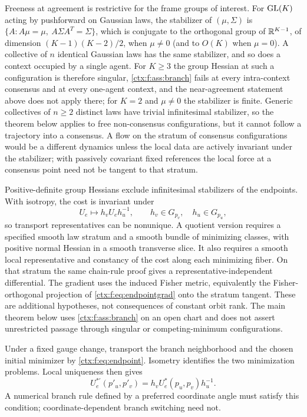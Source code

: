 Freeness at agreement is restrictive for the frame groups of interest. For $\mathrm{GL}(K)$ acting by pushforward on Gaussian laws, the stabilizer of $(\mu,\Sigma)$ is $\{A:A\mu=\mu,\ A\Sigma A^T=\Sigma\}$, which is conjugate to the orthogonal group of $\mathbb R^{K-1}$, of dimension $(K-1)(K-2)/2$, when $\mu\neq0$ (and to $O(K)$ when $\mu=0$). A collective of $n$ identical Gaussian laws has the same stabilizer, and so does a context occupied by a single agent. For $K\geq3$ the group Hessian at such a configuration is therefore singular, \cref{ctx:f:ass:branch} fails at every intra-context consensus and at every one-agent context, and the near-agreement statement above does not apply there; for $K=2$ and $\mu\neq0$ the stabilizer is finite. Generic collectives of $n\geq2$ distinct laws have trivial infinitesimal stabilizer, so the theorem below applies to free non-consensus configurations, but it cannot follow a trajectory into a consensus. A flow on the stratum of consensus configurations would be a different dynamics unless the local data are actively invariant under the stabilizer; with passively covariant fixed references the local force at a consensus point need not be tangent to that stratum.

Positive-definite group Hessians exclude infinitesimal stabilizers of the endpoints. With isotropy, the cost is invariant under
\begin{equation}
 U_e\longmapsto h_vU_eh_u^{-1},\qquad
 h_v\in G_{p_v},\quad h_u\in G_{p_u},
\end{equation}
so transport representatives can be nonunique. A quotient version requires a specified smooth law stratum and a smooth bundle of minimizing classes, with positive normal Hessian in a smooth transverse slice. It also requires a smooth local representative and constancy of the cost along each minimizing fiber. On that stratum the same chain-rule proof gives a representative-independent differential. The gradient uses the induced Fisher metric, equivalently the Fisher-orthogonal projection of \cref{ctx:f:eq:endpointgrad} onto the stratum tangent. These are additional hypotheses, not consequences of constant orbit rank. The main theorem below uses \cref{ctx:f:ass:branch} on an open chart and does not assert unrestricted passage through singular or competing-minimum configurations.

Under a fixed gauge change, transport the branch neighborhood and the chosen initial minimizer by \cref{ctx:f:eq:endpoint}. Isometry identifies the two minimization problems. Local uniqueness then gives
\begin{equation}
 U_e^{*\prime}(p'_u,p'_v)=h_vU_e^*(p_u,p_v)h_u^{-1}.
 \label{ctx:f:eq:branchgauge}
\end{equation}
A numerical branch rule defined by a preferred coordinate angle must satisfy this condition; coordinate-dependent branch switching need not.

